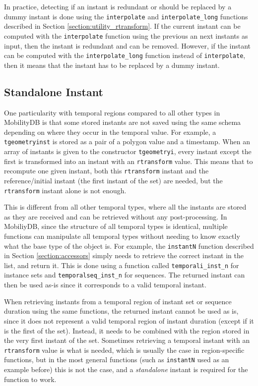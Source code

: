 In practice, detecting if an instant is redundant or should be replaced by a dummy instant is done using the \lstinline{interpolate} and \lstinline{interpolate_long} functions described in Section \ref{section:utility_rtransform}. If the current instant can be computed with the \lstinline{interpolate} function using the previous an next instants as input, then the instant is redundant and can be removed. However, if the instant can be computed with the \lstinline{interpolate_long} function instead of \lstinline{interpolate}, then it means that the instant has to be replaced by a dummy instant.

\subsection{Standalone Instant}
\label{section:standalone_inst}

One particularity with temporal regions compared to all other types in MobilityDB is that some stored instants are not saved using the same  schema depending on where they occur in the temporal value. For example, a \lstinline{tgeometryinst} is stored as a pair of a polygon value and a timestamp. When an array of instants is given to the constructor \lstinline{tgeometryi}, every instant except the first is transformed into an instant with an \lstinline{rtransform} value. This means that to recompute one given instant, both this \lstinline+rtransform+ instant and the reference/initial instant (the first instant of the set) are needed, but the \lstinline+rtransform+ instant alone is not enough. 

This is different from all other temporal types, where all the instants are stored as they are received and can be retrieved without any post-processing. In MobiliyDB, since the structure of all temporal types is identical, multiple functions can manipulate all temporal types without needing to know exactly what the base type of the object is. For example, the \lstinline{instantN} function described in Section \ref{section:accessors} simply needs to retrieve the correct instant in the list, and return it. This is done using a function called \lstinline{temporali_inst_n} for instance sets and \lstinline{temporalseq_inst_n} for sequences. The returned instant can then be used as-is since it corresponds to a valid temporal instant.

When retrieving instants from a temporal region of instant set or sequence duration using the same functions, the returned instant cannot be used as is, since it does not represent a valid temporal region of instant duration (except if it is the first of the set). Instead, it needs to be combined with the region stored in the very first instant of the set. Sometimes retrieving a temporal instant with an \lstinline+rtransform+ value is what is needed, which is usually the case in region-specific functions, but in the most general functions (such as \lstinline{instantN} used as an example before) this is not the case, and a \textit{standalone} instant is required for the function to work.

